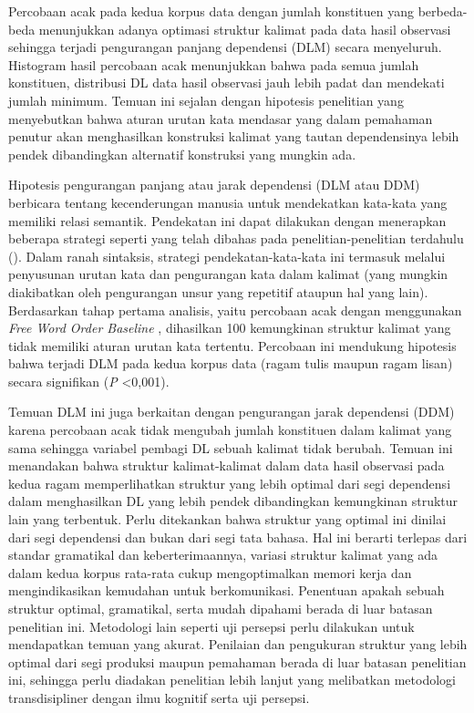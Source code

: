 Percobaan acak pada kedua korpus data dengan jumlah konstituen yang berbeda-beda menunjukkan adanya optimasi struktur kalimat pada data hasil observasi sehingga terjadi pengurangan panjang dependensi (DLM) secara menyeluruh. Histogram hasil percobaan acak menunjukkan bahwa pada semua jumlah konstituen, distribusi DL data hasil observasi jauh lebih padat dan mendekati jumlah minimum. Temuan ini sejalan dengan hipotesis penelitian \cite{hawkins2014cross} yang menyebutkan bahwa aturan urutan kata mendasar yang dalam pemahaman penutur akan menghasilkan konstruksi kalimat yang tautan dependensinya lebih pendek dibandingkan alternatif konstruksi yang mungkin ada.

Hipotesis pengurangan panjang atau jarak dependensi (DLM atau DDM) berbicara tentang kecenderungan manusia untuk mendekatkan kata-kata yang memiliki relasi semantik. Pendekatan ini dapat dilakukan dengan menerapkan beberapa strategi seperti yang telah dibahas pada penelitian-penelitian terdahulu (\citealp{jaeger2006redundancy, gildea2015human}). Dalam ranah sintaksis, strategi pendekatan-kata-kata ini termasuk melalui penyusunan urutan kata dan pengurangan kata dalam kalimat (yang mungkin diakibatkan oleh pengurangan unsur yang repetitif ataupun hal yang lain). Berdasarkan tahap pertama analisis, yaitu percobaan acak dengan menggunakan \textit{Free Word Order Baseline} \citep{futrell2015large}, dihasilkan 100 kemungkinan struktur kalimat yang tidak memiliki aturan urutan kata tertentu. Percobaan ini mendukung hipotesis bahwa terjadi DLM pada kedua korpus data (ragam tulis maupun ragam lisan) secara signifikan (\textit{P} \textless 0,001). 

Temuan DLM ini juga berkaitan dengan pengurangan jarak dependensi (DDM) karena percobaan acak tidak mengubah jumlah konstituen dalam kalimat yang sama sehingga variabel pembagi DL sebuah kalimat tidak berubah. Temuan ini menandakan bahwa struktur kalimat-kalimat dalam data hasil observasi pada kedua ragam memperlihatkan struktur yang lebih optimal dari segi dependensi dalam menghasilkan DL yang lebih pendek dibandingkan kemungkinan struktur lain yang terbentuk. Perlu ditekankan bahwa struktur yang optimal ini dinilai dari segi dependensi dan bukan dari segi tata bahasa. Hal ini berarti terlepas dari standar gramatikal dan keberterimaannya, variasi struktur kalimat yang ada dalam kedua korpus rata-rata cukup mengoptimalkan memori kerja dan mengindikasikan kemudahan untuk berkomunikasi. Penentuan apakah sebuah struktur optimal, gramatikal, serta mudah dipahami berada di luar batasan penelitian ini. Metodologi lain seperti uji persepsi perlu dilakukan untuk mendapatkan temuan yang akurat. Penilaian dan pengukuran struktur yang lebih optimal dari segi produksi maupun pemahaman berada di luar batasan penelitian ini, sehingga perlu diadakan penelitian lebih lanjut yang melibatkan metodologi transdisipliner dengan ilmu kognitif serta uji persepsi.

